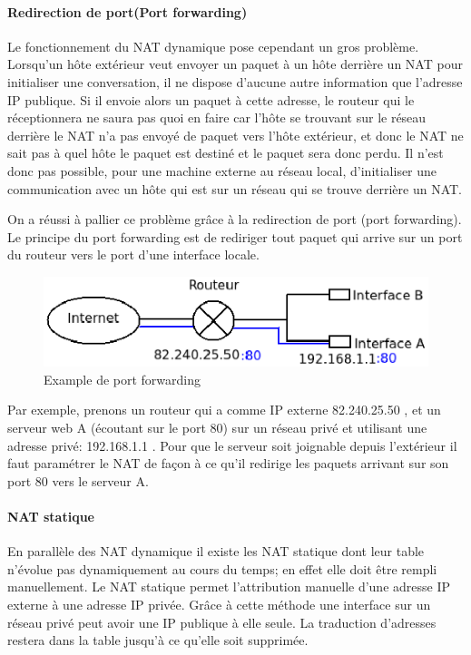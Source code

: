 \paragraph{Redirection de port(Port forwarding)}

Le fonctionnement du NAT dynamique pose cependant un gros problème. Lorsqu'un
hôte extérieur veut envoyer un paquet à un hôte derrière un NAT pour
initialiser une conversation, il ne dispose d'aucune autre information que
l'adresse IP publique. Si il envoie alors un paquet à cette adresse, le routeur
qui le réceptionnera ne saura pas quoi en faire car l'hôte se trouvant sur le
réseau derrière le NAT n'a pas envoyé de paquet vers l'hôte extérieur, et donc
le NAT ne sait pas à quel hôte le paquet est destiné et le paquet sera donc
perdu. Il n'est donc pas possible, pour une machine externe au réseau local,
d'initialiser une communication avec un hôte qui est sur un réseau qui se
trouve derrière un NAT.

On a réussi à pallier ce problème grâce à la redirection de port (port
forwarding).  Le principe du port forwarding est de rediriger tout paquet qui
arrive sur un port du routeur vers le port d'une interface locale.

\begin{figure}[h]
\centering
\includegraphics{./pics/port_forwarding.eps}
\caption{Example de port forwarding}
\label{fig:portfow}
\end{figure}

Par exemple, prenons un routeur qui a comme IP externe 82.240.25.50 , et un
serveur web A (écoutant sur le port 80) sur un réseau privé et utilisant une
adresse privé: 192.168.1.1 . Pour que le serveur soit joignable depuis
l'extérieur il faut paramétrer le NAT de façon à ce qu'il redirige les paquets
arrivant sur son port 80 vers le serveur A.

\paragraph{NAT statique} En parallèle des NAT dynamique il existe les NAT
statique dont leur table n'évolue pas dynamiquement au cours du temps; en effet
elle doit être rempli manuellement.  Le NAT statique permet l'attribution
manuelle d'une adresse IP externe à une adresse IP privée. Grâce à cette
méthode une interface sur un réseau privé peut avoir une IP publique à elle
seule.  La traduction d'adresses restera dans la table jusqu'à ce qu'elle soit
supprimée. 

